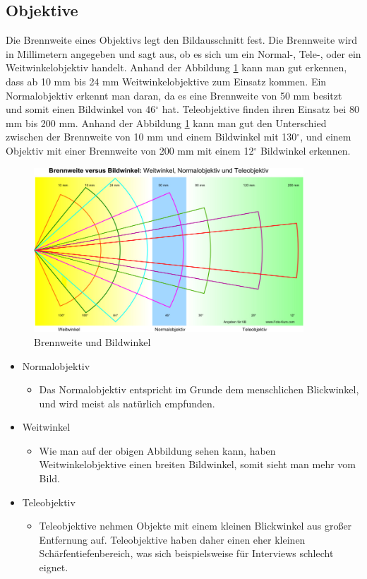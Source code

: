 \subsection{Objektive}
Die Brennweite eines Objektivs legt den Bildausschnitt fest. Die Brennweite wird in Millimetern angegeben und sagt aus, ob es sich um ein Normal-, Tele-, oder ein Weitwinkelobjektiv handelt.
Anhand der Abbildung \ref{fig:abb1} kann man gut erkennen, dass ab 10 mm bis 24 mm Weitwinkelobjektive zum Einsatz kommen. Ein Normalobjektiv erkennt man daran, da es eine Brennweite von 50 mm besitzt und somit einen Bildwinkel von 46$^\circ$ hat. Teleobjektive finden ihren Einsatz bei 80 mm bis 200 mm.\citep{objektiv} Anhand der Abbildung \ref{fig:abb1} kann man gut den Unterschied zwischen der Brennweite von 10 mm und einem Bildwinkel mit 130$^\circ$, und einem Objektiv mit einer Brennweite von 200 mm mit einem 12$^\circ$ Bildwinkel erkennen. 
\begin{figure}[H]
	\centering
	\includegraphics[width=0.9\textwidth]{abb1} 
	\caption[Brennweite und Bildwinkel]{Brennweite und Bildwinkel\footnotemark}\label{fig:abb1}
\end{figure}
\begin{itemize}
	\item Normalobjektiv
		\begin{itemize}
		\item Das Normalobjektiv entspricht im Grunde dem menschlichen Blickwinkel, und wird meist als natürlich empfunden.\citep{normalobjektiv}
		\end{itemize}
	\item Weitwinkel
		\begin{itemize}
		\item Wie man auf der obigen Abbildung sehen kann, haben Weitwinkelobjektive einen breiten Bildwinkel, somit sieht man mehr vom Bild.\citep{normalobjektiv}
		\end{itemize}
	\item Teleobjektiv
		\begin{itemize}
		\item Teleobjektive nehmen Objekte mit einem kleinen Blickwinkel aus großer Entfernung auf. Teleobjektive haben daher einen eher kleinen Schärfentiefenbereich, was sich beispielsweise für Interviews schlecht eignet.\citep{tele}
\end{itemize}
\end{itemize}
